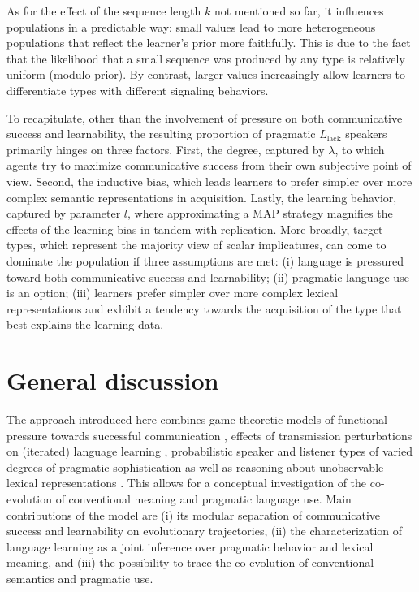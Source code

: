 \documentclass[a4paper, 11pt]{article}
\theoremstyle{Satz}
\newcommand{\mylang}[1]{\ensuremath{L_{\text{#1}}}\xspace} %
\newcommand{\Llack}{\mylang{lack}}
\begin{document}
As for the effect of the sequence length $k$ not mentioned so far, it influences populations in
a predictable way: small values lead to more heterogeneous populations that reflect the
learner's prior more faithfully. This is due to the fact that the likelihood that a small
sequence was produced by any type is relatively uniform (modulo prior). By contrast, larger
values increasingly allow learners to differentiate types with different signaling behaviors.

To recapitulate, other than the involvement of pressure on both communicative success and learnability,
the resulting proportion of pragmatic $\Llack$ speakers primarily hinges on three
factors. First, the degree, captured by $\lambda$, to which agents try to maximize
communicative success from their own subjective point of view. Second, the inductive bias,
which leads learners to prefer simpler over more complex semantic representations in
acquisition. Lastly, the learning behavior, captured by parameter $l$, where approximating a
MAP strategy magnifies the effects of the learning bias in tandem with replication. More broadly,
target types, which represent the majority view of scalar implicatures, can come to
dominate the population if three assumptions are met: (i) language is pressured toward both
communicative success and learnability; (ii) pragmatic language use is an option; (iii) learners prefer
simpler over more complex lexical representations and exhibit a tendency towards the
acquisition of the type that best explains the learning data.


\section{General discussion}\label{sec:discussion}

The approach introduced here combines game theoretic models of functional pressure towards
successful communication \citep{nowak+krakauer:1999}, effects of transmission perturbations on
(iterated) language learning \citep{griffiths+kalish:2007}, probabilistic speaker and listener
types of varied degrees of pragmatic sophistication \citep{frank+goodman:2012,
  franke+jaeger:2014} as well as reasoning about unobservable lexical representations
\citep{bergen+etal:2012,bergen+etal:2016}. This allows for a conceptual investigation of the
co-evolution of conventional meaning and pragmatic language use. Main contributions of the
model are (i) its modular separation of communicative success and learnability on evolutionary
trajectories, (ii) the characterization of language learning as a joint inference over
pragmatic behavior and lexical meaning, and (iii) the possibility to trace the co-evolution of
conventional semantics and pragmatic use.
\end{document}
